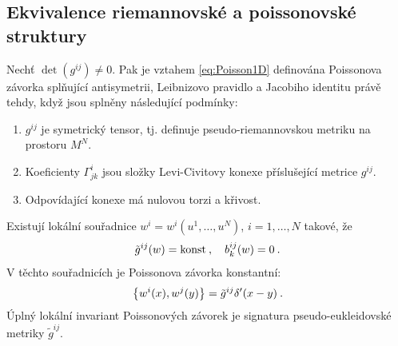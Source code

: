 \subsection{Ekvivalence riemannovské a poissonovské struktury}


\begin{theorem} \label{theorem1:ekvivalence}
    Nechť $\det(g^{ij}) \neq 0$. Pak je vztahem \eqref{eq:Poisson1D} definována Poissonova závorka splňující antisymetrii, Leibnizovo pravidlo a Jacobiho identitu právě tehdy, když jsou splněny následující podmínky:
    \begin{enumerate}
        \item $g^{ij}$ je symetrický tensor, tj. definuje pseudo-riemannovskou metriku na prostoru $M^N$.
        \item Koeficienty $\Gamma^{i}_{jk}$ jsou složky Levi-Civitovy konexe příslušející metrice $g^{ij}$.
        \item Odpovídající konexe má nulovou torzi a křivost.
    \end{enumerate}
\end{theorem}

\begin{corollary*}
    Existují lokální souřadnice $w^i = w^i(u^1, \dots, u^N)$, $i = 1, \dots, N$ takové, že
    \begin{align}
        \tilde g^{ij}(w) = \mathrm{konst} \:, \quad b^{ij}_k (w) = 0 \:.
    \end{align}
    V těchto souřadnicích je Poissonova závorka konstantní:
    \begin{align}
        \left \lbrace w^i(x),w^j(y) \right \rbrace = \tilde{g}^{ij} \delta'(x-y) \:.
    \end{align}
    Úplný lokální invariant Poissonových závorek je signatura pseudo-eukleidovské metriky $\tilde g^{ij}$.
\end{corollary*}

